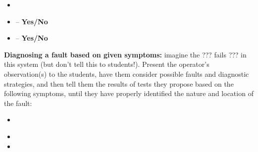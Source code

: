 \begin{itemize}
\item{} {\it }
\item{}  -- {\bf Yes/No}
\item{}  -- {\bf Yes/No}
\end{itemize}


\vskip 10pt


\noindent
{\bf Diagnosing a fault based on given symptoms:} imagine the ??? fails ??? in this system (but don't tell this to students!).  Present the operator's observation(s) to the students, have them consider possible faults and diagnostic strategies, and then tell them the results of tests they propose based on the following symptoms, until they have properly identified the nature and location of the fault:

\begin{itemize}
\item{} {\it }
\item{} 
\item{} 
\end{itemize}



